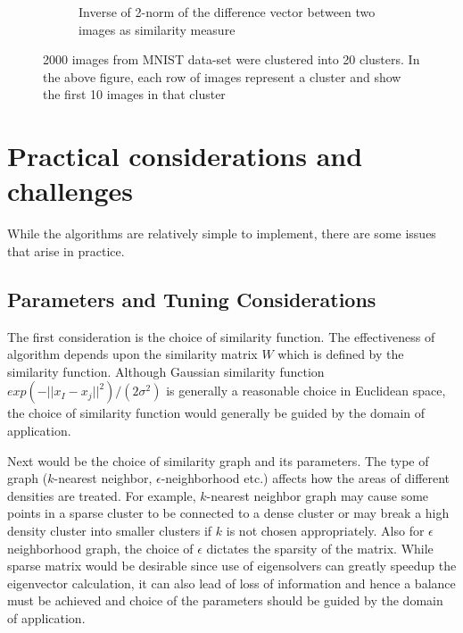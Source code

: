 \documentclass[10pt,a4paper, nocenter]{report}
\newcommand{\norm}[1]{\lvert\lvert {#1} \rvert\rvert}
\begin{document}
\begin{enumerate}
\begin{figure}[h]
\begin{center}
\begin{subfigure}[b]{0.4\textwidth}
                    \caption{Inverse of 2-norm of the difference vector between two images as similarity measure}
                    \label{fig:clustering_20_2norm}
                \end{subfigure}
            \end{center}
            \caption{2000 images from MNIST data-set were clustered into 20 clusters. In the above figure, each row of images represent a cluster and show the first 10 images in that cluster}
            \label{fig:mnistImages}
        \end{figure}

        
    \end{enumerate}
    
    
    \section{Practical considerations and challenges}

    While the algorithms are relatively simple to implement, there are some issues that arise in practice. 
    
    \subsection{Parameters and Tuning Considerations}
    The first consideration is the choice of similarity function. The effectiveness of algorithm depends upon the similarity matrix $W$ which is defined by the similarity function. Although Gaussian similarity function $exp(-\norm{x_I - x_j}^2)/(2\sigma^2)$ is generally a reasonable choice in Euclidean space, the choice of similarity function would generally be guided by the domain of application. 

    Next would be the choice of similarity graph and its parameters. The type of graph ($k$-nearest neighbor, $\epsilon$-neighborhood etc.) affects how the areas of different densities are treated. For example, $k$-nearest neighbor graph may cause some points in a sparse cluster to be connected to a dense cluster or may break a high density cluster into smaller clusters if $k$ is not chosen appropriately. Also for $\epsilon$ neighborhood graph, the choice of $\epsilon$ dictates the sparsity of the matrix. While sparse matrix would be desirable since use of eigensolvers can greatly speedup the eigenvector calculation, it can also lead of loss of information and hence a balance must be achieved and choice of the parameters should be guided by the domain of application. 
\end{document}
